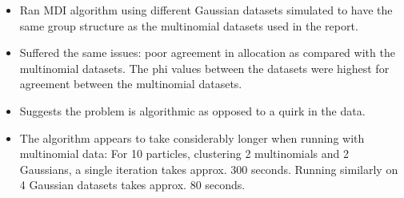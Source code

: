 \documentclass[10pt,a4paper]{report}
\begin{document}
\begin{itemize}
\item Ran MDI algorithm using different Gaussian datasets simulated to have the same group structure as the multinomial datasets used in the report.
\item Suffered the same issues: poor agreement in allocation as compared with the multinomial datasets. The phi values between the datasets were highest for agreement between the multinomial datasets.
\item Suggests the problem is algorithmic as opposed to a quirk in the data.
\item The algorithm appears to take considerably longer when running with multinomial data: For 10 particles, clustering 2 multinomials and 2 Gaussians, a single iteration takes approx. 300 seconds. Running similarly on 4 Gaussian datasets takes approx. 80 seconds.
\end{itemize}
\end{document}
